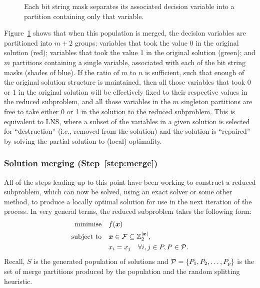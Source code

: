 \documentclass[journal]{IEEEtran}
\begin{document}
\begin{figure}[h]
\centering
{}
\caption[Demonstrtation that Merge Search is equivalent to LNS]
       {Each bit string mask separates its associated decision variable into a partition containing only that variable.}
\label{fig:lns-merge}
\end{figure}

Figure~\ref{fig:lns-merge} shows that when this population is merged, the decision variables are partitioned into $m+2$ groups: variables that took the value 0 in the original solution (red); variables that took the value 1 in the original solution (green); and $m$ partitions containing a single variable, associated with each of the bit string masks (shades of blue). If the ratio of $m$ to $n$ is sufficient, such that enough of the original solution structure is maintained, then all those variables that took 0 or 1 in the original solution will be effectively fixed to their respective values in the reduced subproblem, and all those variables in the $m$ singleton partitions are free to take either 0 or 1 in the solution to the reduced subproblem. This is equivalent to LNS, where a subset of the variables in a given solution is selected for ``destruction'' (i.e., removed from the solution) and the solution is ``repaired'' by solving the partial solution to (local) optimality. 

\subsubsection*{Solution merging (Step~\ref{step:merge})}
All of the steps leading up to this point have been working to construct a reduced subproblem, which can now be solved, using an exact solver or some other method, to produce a locally optimal solution for use in the next iteration of the process. In very general terms, the reduced subproblem takes the following form:
\begin{align}
              \Min \quad & f(\V{x})\label{eq:merge_group}\\
              \ST \quad  &\V{x} \in \S{F} \subseteq \Int_2^{|\V{x}|},\nonumber\\
              & x_i = x_j \quad \forall i,j \in P, P \in {\cal P}.\nonumber
\end{align}
Recall, $S$ is the generated population of solutions and ${\cal P} = \{P_1,P_2,\dots,P_p\}$ is the set of merge partitions produced by the population and the random splitting heuristic.
\end{document}
